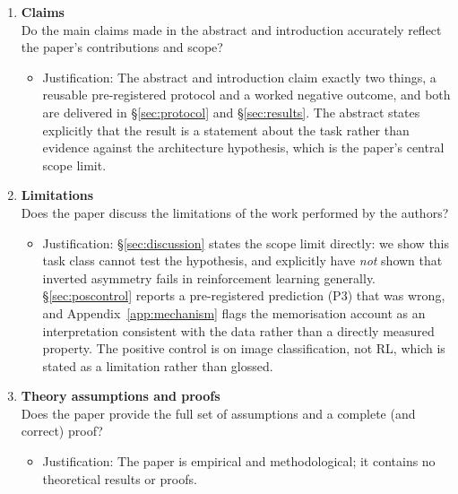 
\begin{enumerate}

\item {\bf Claims}\\
Do the main claims made in the abstract and introduction accurately reflect the paper's
contributions and scope?
\answerYes{}
\begin{itemize}
\item[] Justification: The abstract and introduction claim exactly two things, a reusable
  pre-registered protocol and a worked negative outcome, and both are delivered in
  \S\ref{sec:protocol} and \S\ref{sec:results}. The abstract states explicitly that the
  result is a statement about the task rather than evidence against the architecture
  hypothesis, which is the paper's central scope limit.
\end{itemize}

\item {\bf Limitations}\\
Does the paper discuss the limitations of the work performed by the authors?
\answerYes{}
\begin{itemize}
\item[] Justification: \S\ref{sec:discussion} states the scope limit directly: we show this
  task class cannot test the hypothesis, and explicitly have \emph{not} shown that inverted
  asymmetry fails in reinforcement learning generally. \S\ref{sec:poscontrol} reports a
  pre-registered prediction (P3) that was wrong, and Appendix~\ref{app:mechanism} flags the
  memorisation account as an interpretation consistent with the data rather than a directly
  measured property. The positive control is on image classification, not RL, which is stated
  as a limitation rather than glossed.
\end{itemize}

\item {\bf Theory assumptions and proofs}\\
Does the paper provide the full set of assumptions and a complete (and correct) proof?
\answerNA{}
\begin{itemize}
\item[] Justification: The paper is empirical and methodological; it contains no theoretical
  results or proofs.
\end{itemize}


\end{enumerate}
